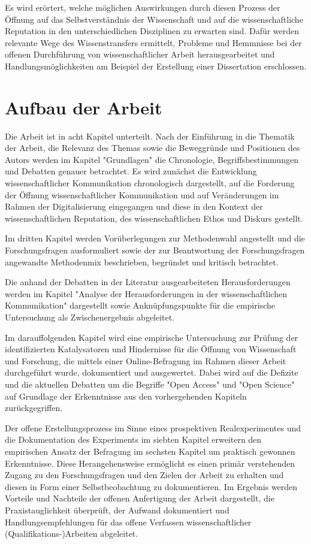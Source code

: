 Es wird erörtert, welche möglichen Auswirkungen durch diesen Prozess der Öffnung auf das Selbstverständnis der Wissenschaft und auf die wissenschaftliche Reputation in den unterschiedlichen Disziplinen zu erwarten sind. Dafür werden relevante Wege des Wissenstransfers ermittelt, Probleme und Hemmnisse bei der offenen Durchführung von wissenschaftlicher Arbeit herausgearbeitet und Handlungsmöglichkeiten am Beispiel der Erstellung einer Dissertation erschlossen.

\section{Aufbau der Arbeit}

Die Arbeit ist in acht Kapitel unterteilt. Nach der Einführung in die Thematik der Arbeit, die Relevanz des Themas sowie die Beweggründe und Positionen des Autors werden im Kapitel "Grundlagen" die Chronologie, Begriffsbestimmungen und Debatten genauer betrachtet. Es wird zunächst die Entwicklung wissenschaftlicher Kommunikation chronologisch dargestellt, auf die Forderung der Öffnung wissenschaftlicher Kommunikation und auf Veränderungen im Rahmen der Digitalisierung eingegangen und diese in den Kontext der wissenschaftlichen Reputation, des wissenschaftlichen Ethos und Diskurs gestellt.

Im dritten Kapitel werden Vorüberlegungen zur Methodenwahl angestellt und die Forschungsfragen ausformuliert sowie der zur Beantwortung der Forschungsfragen angewandte Methodenmix beschrieben, begründet und kritisch betrachtet.

Die anhand der Debatten in der Literatur ausgearbeiteten Herausforderungen werden im Kapitel "Analyse der Herausforderungen in der wissenschaftlichen Kommunikation" dargestellt sowie Anknüpfungspunkte für die empirische Untersuchung als Zwischenergebnis abgeleitet.

Im darauffolgenden Kapitel wird eine empirische Untersuchung zur Prüfung der identifizierten Katalysatoren und Hindernisse für die Öffnung von Wissenschaft und Forschung, die mittels einer Online-Befragung im Rahmen dieser Arbeit durchgeführt wurde, dokumentiert und ausgewertet. Dabei wird auf die Defizite und die aktuellen Debatten um die Begriffe "Open Access" und "Open Science" auf Grundlage der Erkenntnisse aus den vorhergehenden Kapiteln zurückgegriffen.

Der offene Erstellungsprozess im Sinne eines prospektiven Realexperimentes und die Dokumentation des Experiments im siebten Kapitel erweitern den empirischen Ansatz der Befragung im sechsten Kapitel um praktisch gewonnen Erkenntnisse. Diese Herangehensweise ermöglicht es einen primär verstehenden Zugang zu den Forschungsfragen und den Zielen der Arbeit zu erhalten und diesen in Form einer Selbstbeobachtung zu dokumentieren. Im Ergebnis werden Vorteile und Nachteile der offenen Anfertigung der Arbeit dargestellt, die Praxistauglichkeit überprüft, der Aufwand dokumentiert und Handlungsempfehlungen für das offene Verfassen wissenschaftlicher (Qualifikations-)Arbeiten abgeleitet.

